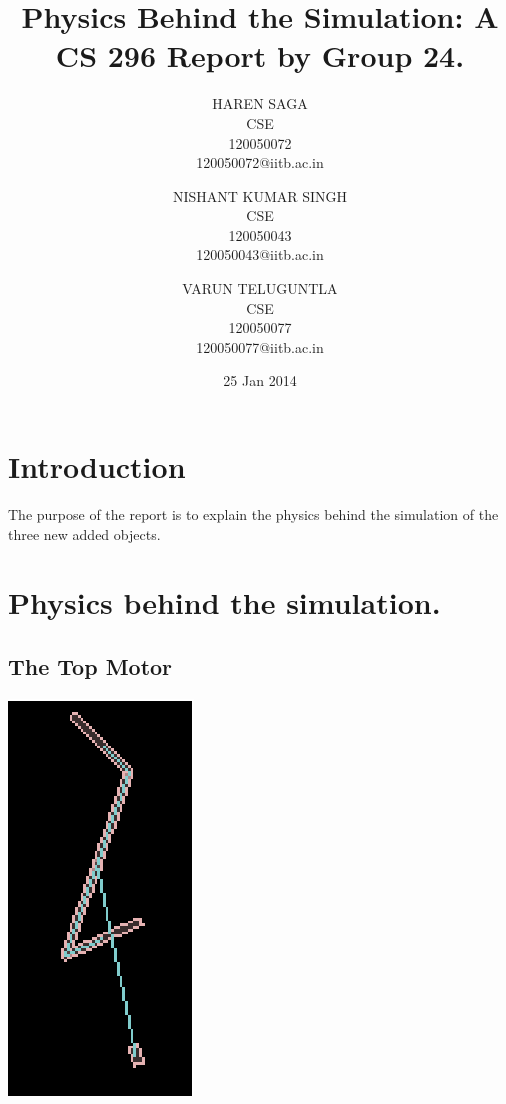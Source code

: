 \documentclass [11pt]{article}
\begin{document}
\title{Physics Behind the Simulation: A CS 296 Report by Group 24.}
\author{
    HAREN SAGA\\
    CSE\\
    120050072\\
    120050072@iitb.ac.in
      \and
    NISHANT KUMAR SINGH\\
    CSE\\    
    120050043\\
    120050043@iitb.ac.in
    \and
    VARUN TELUGUNTLA\\
    CSE\\
    120050077\\
   120050077@iitb.ac.in
}
\date{25 Jan 2014}

\maketitle

\section{Introduction}
The purpose of the report is to explain the physics behind the simulation of the three new
added objects.
\section{Physics behind the simulation.} 
\subsection{The Top Motor}
\includegraphics [scale=0.7]{xn}\\\
\end{document}
